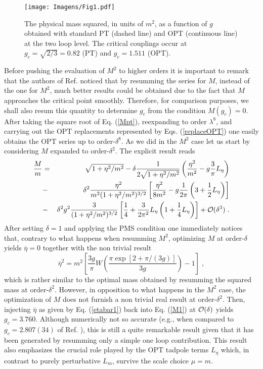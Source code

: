 \documentclass[a4paper,11pt]{article}
\def\nn{\nonumber}
\def\lm{L_m}
\def\leta{L_\eta}
\begin{document}
\begin{figure}[ht!]

    \centering
    \texttt{[image: Imagens/Fig1.pdf]}
        \caption{The physical mass squared, in units of $m^2$,  as a function of $g$ obtained with standard PT (dashed line) and OPT (continuous line) at the two loop level. The critical couplings occur at $g_c = \sqrt{2/3} = 0.82$ (PT) and $g_c = 1.511$ (OPT). }
    \label{Fig1}
\end{figure}
Before pushing the evaluation of $M^2$ to higher orders it is important to remark that the authors of Ref. \cite {serone3} noticed that by resumming the series for $M$, instead of the one for $M^2$, much better results could be obtained due to the fact that $M$ approaches the critical point smoothly. Therefore, for comparison purposes, we shall also resum this quantity to determine $g_c$ from the condition $M(g_c)=0$. After taking the square root of Eq. (\ref{Mpt}), reexpanding to order $\lambda^8$, and carrying out the OPT replacements represented by Eqs. (\ref {replaceOPT}) one easily obtains  the OPT series up to order-$\delta^8$. As we did in the $M^2$ case let us start by considering $M$ expanded to order-$\delta^2$. The explicit result reads
\begin{eqnarray}
\frac{M}{m} &= &\sqrt{1 + \eta^2/m^2} - \delta\frac{1}{2\sqrt{1 + \eta^2/m^2}}\left ( \frac {\eta^2}{m^2} - g \frac{3}{\pi} L_\eta \right )\nn \\
& -&  \delta^2 \frac{\eta^2}{m^2(1 + \eta^2/m^2)^{3/2}}\left [ \frac{\eta^2}{8m^2} - g \frac{1 }{2\pi }\left ( 3 + \frac{1}{2} L_\eta\right )\right ]\nn \\
&-& \delta^2 g^2 \frac{3 }{(1 + \eta^2/m^2)^{3/2}} \left [   \frac{1}{4} +  \frac{3}{2\pi^2}L_\eta \left (1  +  \frac{1}{4} L_\eta \right ) \right ]
+ {\cal O}(\delta^3) \;.
\label{M1}
\end{eqnarray}
After setting $\delta=1$ and applying the PMS condition one immediately notices that, contrary to what happens when resumming $M^2$, optimizing $M$  at order-$\delta$ yields ${\overline \eta} =0$ together with the non trivial result
\begin{equation}
{\overline \eta}^2 = m^2 \left [\frac{3g}{\pi}  W\left ( \frac{\pi \exp[2 + \pi/(3g)] }{3g} \right ) - 1 \right ] \;,
\label{etabar1}
\end{equation}
which is rather similar to the optimal mass obtained by resumming the squared mass at order-$\delta^2$. However, in opposition to what happens in the $M^2$ case, the optimization of $M$ does not furnish a non trivial real result at order-$\delta^2$. Then,  injecting   $\overline \eta$  as given by Eq. (\ref {etabar1}) back into Eq. (\ref {M1})  at ${\cal O}(\delta)$ yields $g_c =3.760$. Although numerically not so accurate (e.g., when compared to $g_c = 2.807(34)$ of Ref. \cite{serone1}), this is still a quite remarkable result given that it has been generated by resumming only a simple one loop contribution. This result  also emphasizes the crucial role  played by the OPT tadpole terms $\leta$ which,  in contrast to purely perturbative $\lm$,  survive the scale choice $\mu=m$.
\end{document}
